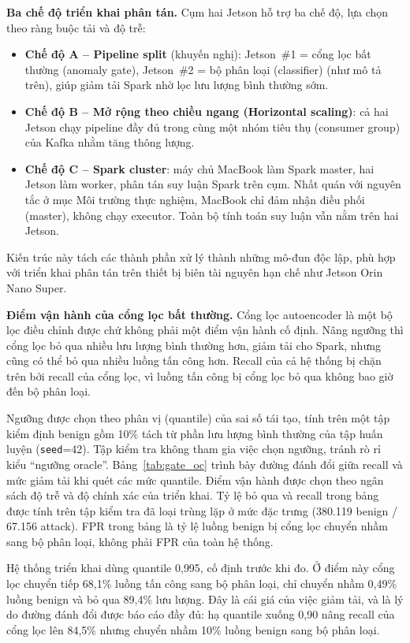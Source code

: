 \textbf{Ba chế độ triển khai phân tán.} Cụm hai Jetson hỗ trợ ba chế độ, lựa chọn theo ràng buộc tải và độ trễ:
\begin{itemize}
    \item \textbf{Chế độ A -- Pipeline split} (khuyến nghị): Jetson~\#1 = cổng lọc bất thường (anomaly gate), Jetson~\#2 = bộ phân loại (classifier) (như mô tả trên), giúp giảm tải Spark nhờ lọc lưu lượng bình thường sớm.
    \item \textbf{Chế độ B -- Mở rộng theo chiều ngang (Horizontal scaling)}: cả hai Jetson chạy pipeline đầy đủ trong cùng một nhóm tiêu thụ (consumer group) của Kafka nhằm tăng thông lượng.
    \item \textbf{Chế độ C -- Spark cluster}: máy chủ MacBook làm Spark master, hai Jetson làm worker, phân tán suy luận Spark trên cụm. Nhất quán với nguyên tắc ở mục Môi trường thực nghiệm, MacBook chỉ đảm nhận điều phối (master), không chạy executor. Toàn bộ tính toán suy luận vẫn nằm trên hai Jetson.
\end{itemize}

Kiến trúc này tách các thành phần xử lý thành những mô-đun độc lập, phù hợp với triển khai phân tán trên thiết bị biên tài nguyên hạn chế như Jetson Orin Nano Super.

\textbf{Điểm vận hành của cổng lọc bất thường.} Cổng lọc autoencoder là một bộ lọc điều chỉnh được chứ không phải một điểm vận hành cố định. Nâng ngưỡng thì cổng lọc bỏ qua nhiều lưu lượng bình thường hơn, giảm tải cho Spark, nhưng cũng có thể bỏ qua nhiều luồng tấn công hơn. Recall của cả hệ thống bị chặn trên bởi recall của cổng lọc, vì luồng tấn công bị cổng lọc bỏ qua không bao giờ đến bộ phân loại.

Ngưỡng được chọn theo phân vị (quantile) của sai số tái tạo, tính trên một tập kiểm định benign gồm 10\% tách từ phần lưu lượng bình thường của tập huấn luyện (\texttt{seed}=42). Tập kiểm tra không tham gia việc chọn ngưỡng, tránh rò rỉ kiểu ``ngưỡng oracle''. Bảng~\ref{tab:gate_oc} trình bày đường đánh đổi giữa recall và mức giảm tải khi quét các mức quantile. Điểm vận hành được chọn theo ngân sách độ trễ và độ chính xác của triển khai. Tỷ lệ bỏ qua và recall trong bảng được tính trên tập kiểm tra đã loại trùng lặp ở mức đặc trưng (380.119 benign / 67.156 attack). FPR trong bảng là tỷ lệ luồng benign bị cổng lọc chuyển nhầm sang bộ phân loại, không phải FPR của toàn hệ thống.

Hệ thống triển khai dùng quantile 0{,}995, cố định trước khi đo. Ở điểm này cổng lọc chuyển tiếp 68{,}1\% luồng tấn công sang bộ phân loại, chỉ chuyển nhầm 0{,}49\% luồng benign và bỏ qua 89{,}4\% lưu lượng. Đây là cái giá của việc giảm tải, và là lý do đường đánh đổi được báo cáo đầy đủ: hạ quantile xuống 0{,}90 nâng recall của cổng lọc lên 84{,}5\% nhưng chuyển nhầm 10\% luồng benign sang bộ phân loại.

